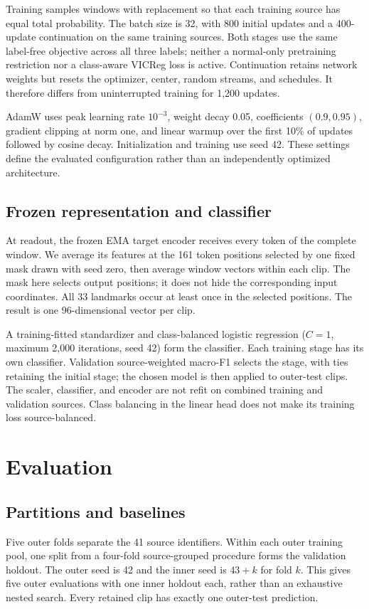 \documentclass[10pt,twocolumn,letterpaper]{article}
\begin{document}
Training samples windows with replacement so that each training source has equal total probability. The batch size is 32, with 800 initial updates and a 400-update continuation on the same training sources. Both stages use the same label-free objective across all three labels; neither a normal-only pretraining restriction nor a class-aware VICReg loss is active. Continuation retains network weights but resets the optimizer, center, random streams, and schedules. It therefore differs from uninterrupted training for 1,200 updates.

AdamW uses peak learning rate $10^{-3}$, weight decay 0.05, coefficients $(0.9,0.95)$, gradient clipping at norm one, and linear warmup over the first 10\% of updates followed by cosine decay. Initialization and training use seed 42. These settings define the evaluated configuration rather than an independently optimized architecture.

\subsection{Frozen representation and classifier}
At readout, the frozen EMA target encoder receives every token of the complete window. We average its features at the 161 token positions selected by one fixed mask drawn with seed zero, then average window vectors within each clip. The mask here selects output positions; it does not hide the corresponding input coordinates. All 33 landmarks occur at least once in the selected positions. The result is one 96-dimensional vector per clip.

A training-fitted standardizer and class-balanced logistic regression ($C=1$, maximum 2,000 iterations, seed 42) form the classifier. Each training stage has its own classifier. Validation source-weighted macro-F1 selects the stage, with ties retaining the initial stage; the chosen model is then applied to outer-test clips. The scaler, classifier, and encoder are not refit on combined training and validation sources. Class balancing in the linear head does not make its training loss source-balanced.

\section{Evaluation}
\subsection{Partitions and baselines}
Five outer folds separate the 41 source identifiers. Within each outer training pool, one split from a four-fold source-grouped procedure forms the validation holdout. The outer seed is 42 and the inner seed is $43+k$ for fold $k$. This gives five outer evaluations with one inner holdout each, rather than an exhaustive nested search. Every retained clip has exactly one outer-test prediction.
\end{document}
